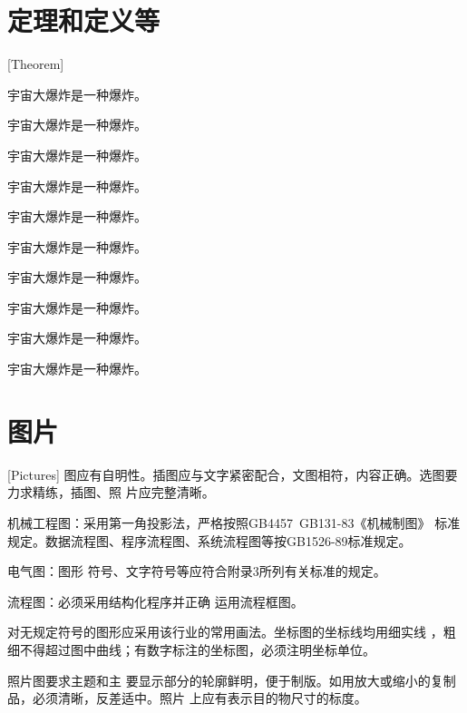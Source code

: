 \section{定理和定义等}[Theorem]
\begin{theorem}
  宇宙大爆炸是一种爆炸。
\end{theorem}
\begin{definition}[（霍金）]
  宇宙大爆炸是一种爆炸。
\end{definition}
\begin{assumption}
  宇宙大爆炸是一种爆炸。
\end{assumption}
\begin{lemma}
  宇宙大爆炸是一种爆炸。
\end{lemma}
\begin{corollary}
  宇宙大爆炸是一种爆炸。
\end{corollary}
\begin{exercise}
  宇宙大爆炸是一种爆炸。
\end{exercise}
\begin{problem}
宇宙大爆炸是一种爆炸。
\end{problem}
\begin{remark}
  宇宙大爆炸是一种爆炸。
\end{remark}
\begin{axiom}[（爱因斯坦）]
  宇宙大爆炸是一种爆炸。
\end{axiom}
\begin{conjecture}
  宇宙大爆炸是一种爆炸。
\end{conjecture}

\section{图片}[Pictures]
图应有自明性。插图应与文字紧密配合，文图相符，内容正确。选图要力求精练，插图、照
片应完整清晰。

机械工程图：采用第一角投影法，严格按照GB4457~GB131-83《机械制图》
标准规定。数据流程图、程序流程图、系统流程图等按GB1526-89标准规定。

电气图：图形
符号、文字符号等应符合附录3所列有关标准的规定。

流程图：必须采用结构化程序并正确
运用流程框图。

对无规定符号的图形应采用该行业的常用画法。坐标图的坐标线均用细实线
，粗细不得超过图中曲线；有数字标注的坐标图，必须注明坐标单位。

照片图要求主题和主
要显示部分的轮廓鲜明，便于制版。如用放大或缩小的复制品，必须清晰，反差适中。照片
上应有表示目的物尺寸的标度。

